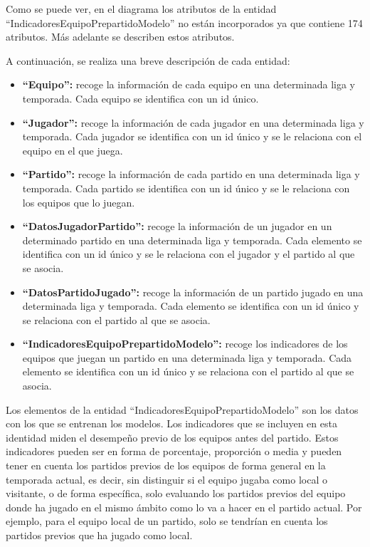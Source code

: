 Como se puede ver, en el diagrama los atributos de la entidad ``IndicadoresEquipoPrepartidoModelo'' no están incorporados ya que contiene 174 atributos. Más adelante se describen estos atributos.

A continuación, se realiza una breve descripción de cada entidad:
\begin{itemize}
    \item \textbf{``Equipo'':} recoge la información de cada equipo en una determinada liga y temporada. Cada equipo se identifica con un id único.
    \item \textbf{``Jugador'':} recoge la información de cada jugador en una determinada liga y temporada.
          Cada jugador se identifica con un id único y se le relaciona con el equipo en el que juega.
    \item \textbf{``Partido'':} recoge la información de cada partido en una determinada liga y temporada. Cada
          partido se identifica con un id único y se le relaciona con los equipos que lo juegan.
    \item \textbf{``DatosJugadorPartido'':} recoge la información de un jugador en un determinado partido en
          una determinada liga y temporada. Cada elemento se identifica con un id único y se le
          relaciona con el jugador y el partido al que se asocia.
    \item \textbf{``DatosPartidoJugado'':} recoge la información de un partido jugado en una determinada liga
          y temporada. Cada elemento se identifica con un id único y se relaciona con el partido al
          que se asocia.
    \item \textbf{``IndicadoresEquipoPrepartidoModelo'':} recoge los indicadores de los equipos que juegan
          un partido en una determinada liga y temporada. Cada elemento se identifica con un id
          único y se relaciona con el partido al que se asocia.
\end{itemize}

Los elementos de la entidad ``IndicadoresEquipoPrepartidoModelo'' son los datos con los que se
entrenan los modelos. Los indicadores que se incluyen en esta identidad miden el desempeño
previo de los equipos antes del partido. Estos indicadores pueden ser en forma de porcentaje,
proporción o media y pueden tener en cuenta los partidos previos de los equipos de forma general
en la temporada actual, es decir, sin distinguir si el equipo jugaba como local o visitante, o de
forma específica, solo evaluando los partidos previos del equipo donde ha jugado en el mismo
ámbito como lo va a hacer en el partido actual. Por ejemplo, para el equipo local de un partido,
solo se tendrían en cuenta los partidos previos que ha jugado como local.

